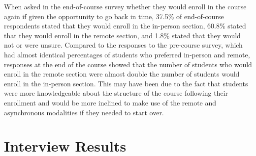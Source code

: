 When asked in the end-of-course survey whether they would enroll in the course again if given the opportunity to go back in time, 37.5\% of end-of-course respondents stated that they would enroll in the in-person section, 60.8\% stated that they would enroll in the remote section, and 1.8\% stated that they would not or were unsure. Compared to the responses to the pre-course survey, which had almost identical percentages of students who preferred in-person and remote, responses at the end of the course showed that the number of students who would enroll in the remote section were almost double the number of students would enroll in the in-person section. This may have been due to the fact that students were more knowledgeable about the structure of the course following their enrollment and would be more inclined to make use of the remote and asynchronous modalities if they needed to start over.

\section{Interview Results}


